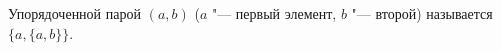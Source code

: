 
    Упорядоченной парой $(a,b)$ ($a$ "--- первый элемент, $b$ "--- второй) называется $\big\{a,\{a,b\}\big\}$.
